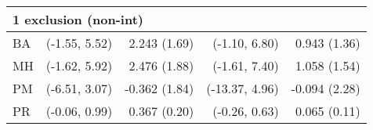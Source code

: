 \begin{table}[t]
\begin{tabular}{lrrrr}
\midrule
\multicolumn{5}{l}{1 exclusion (non-int)} \\ 
\midrule
\hspace{11.25pt} BA & (-1.55, 5.52) & 2.243 (1.69) & (-1.10, 6.80) & 0.943 (1.36) \\ 
\hspace{11.25pt} MH & (-1.62, 5.92) & 2.476 (1.88) & (-1.61, 7.40) & 1.058 (1.54) \\ 
\hspace{11.25pt} PM & (-6.51, 3.07) & -0.362 (1.84) & (-13.37, 4.96) & -0.094 (2.28) \\ 
\hspace{11.25pt} PR & (-0.06, 0.99) & 0.367 (0.20) & (-0.26, 0.63) & 0.065 (0.11) \\ 
\bottomrule
\end{tabular}
\end{table}

